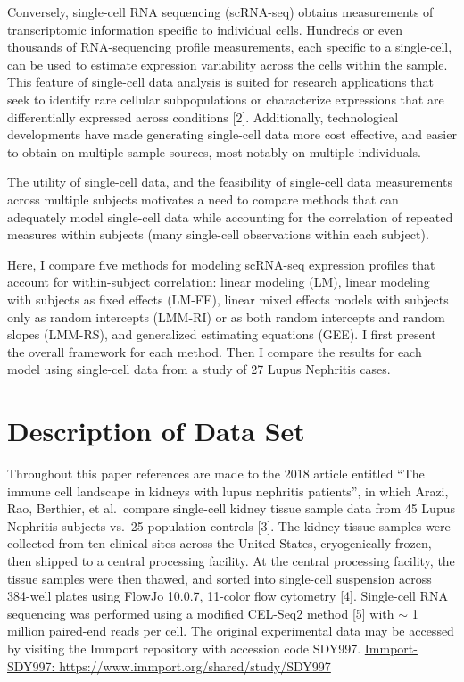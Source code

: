 \documentclass[12pt,]{article}
\begin{document}
Conversely, single-cell RNA sequencing (scRNA-seq) obtains measurements
of transcriptomic information specific to individual cells. Hundreds or
even thousands of RNA-sequencing profile measurements, each specific to
a single-cell, can be used to estimate expression variability across the
cells within the sample. This feature of single-cell data analysis is
suited for research applications that seek to identify rare cellular
subpopulations or characterize expressions that are differentially
expressed across conditions {[}2{]}. Additionally, technological
developments have made generating single-cell data more cost effective,
and easier to obtain on multiple sample-sources, most notably on
multiple individuals.

The utility of single-cell data, and the feasibility of single-cell data
measurements across multiple subjects motivates a need to compare
methods that can adequately model single-cell data while accounting for
the correlation of repeated measures within subjects (many single-cell
observations within each subject).

Here, I compare five methods for modeling scRNA-seq expression profiles
that account for within-subject correlation: linear modeling (LM),
linear modeling with subjects as fixed effects (LM-FE), linear mixed
effects models with subjects only as random intercepts (LMM-RI) or as
both random intercepts and random slopes (LMM-RS), and generalized
estimating equations (GEE). I first present the overall framework for
each method. Then I compare the results for each model using single-cell
data from a study of 27 Lupus Nephritis cases.

\hypertarget{description-of-data-set}{%
\section{Description of Data Set}\label{description-of-data-set}}

Throughout this paper references are made to the 2018 article entitled
``The immune cell landscape in kidneys with lupus nephritis patients'',
in which Arazi, Rao, Berthier, et al.~compare single-cell kidney tissue
sample data from 45 Lupus Nephritis subjects vs.~25 population controls
{[}3{]}. The kidney tissue samples were collected from ten clinical
sites across the United States, cryogenically frozen, then shipped to a
central processing facility. At the central processing facility, the
tissue samples were then thawed, and sorted into single-cell suspension
across 384-well plates using FlowJo 10.0.7, 11-color flow cytometry
{[}4{]}. Single-cell RNA sequencing was performed using a modified
CEL-Seq2 method {[}5{]} with \(\sim\) 1 million paired-end reads per
cell. The original experimental data may be accessed by visiting the
Immport repository with accession code SDY997.
\href{https://www.immport.org/shared/study/SDY997}{Immport-SDY997:
https://www.immport.org/shared/study/SDY997}
\end{document}
